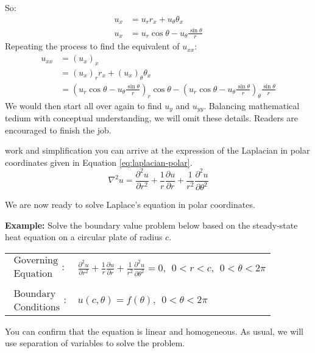 So:
\begin{align*}
u_x &= u_r r_x + u_{\theta} \theta_x \\
u_x &= u_r \cos{\theta} - u_{\theta}\frac{\sin{\theta}}{r}
\end{align*}
Repeating the process to find the equivalent of $u_{xx}$:
\begin{align*}
u_{xx} &= \left(u_{x}\right)_{x} \\
&= \left(u_x\right)_r r_x + \left(u_x\right)_{\theta} \theta_x \\
&= \left(u_r \cos{\theta} - u_{\theta}\frac{\sin{\theta}}{r} \right)_r \cos{\theta} - \left( u_r \cos{\theta} - u_{\theta}\frac{\sin{\theta}}{r}\right)_{\theta}\frac{\sin{\theta}}{r}
\end{align*}
We would then start all over again to find $u_y$ and $u_{yy}$.  Balancing mathematical tedium with conceptual understanding, we will omit these details.  Readers are encouraged to finish the job.

 work and simplification you can arrive at the expression of the Laplacian in polar coordinates given in Equation \ref{eq:laplacian-polar}.
\begin{equation}
\nabla^2u = \frac{\partial^2 u}{\partial r^2} + \frac{1}{r}\frac{\partial u}{\partial r} + \frac{1}{r^2}\frac{\partial^2 u}{\partial \theta^2}
\label{eq:laplacian-polar}
\end{equation}

We are now ready to solve Laplace's equation in polar coordinates.

\vspace{0.25cm}

\noindent\textbf{Example:} Solve the boundary value problem below based on the steady-state heat equation on a circular plate of radius $c$.

\begin{table}[h]
\begin{tabular}{l l}
$\substack{\text{Governing} \\\text{Equation}}: $& $\frac{\partial^2 u}{\partial r^2} + \frac{1}{r}\frac{\partial u}{\partial r} + \frac{1}{r^2}\frac{\partial^2 u}{\partial \theta^2}= 0, \ \ 0<r<c, \ \ 0<\theta<2 \pi $\\
& \\
$\substack{\text{Boundary} \\ \text{Conditions}}: $ & $u(c,\theta) = f(\theta), \ \ 0 < \theta< 2 \pi$\\
\end{tabular}
\end{table} 
You can confirm that the equation is linear and homogeneous.  As usual, we will use separation of variables to solve the problem.

